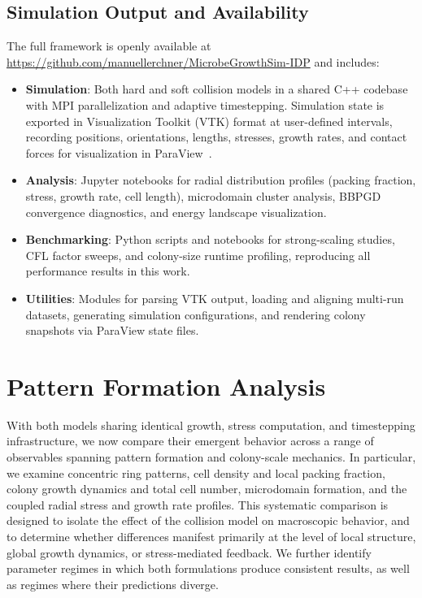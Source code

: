 \documentclass[a4paper,fleqn]{cas-dc}
\begin{document}
\subsection{Simulation Output and Availability}

The full framework is openly available at \url{https://github.com/manuellerchner/MicrobeGrowthSim-IDP} and includes:

\begin{itemize}
    \item \textbf{Simulation}: Both hard and soft collision models in a shared C++ codebase with MPI parallelization and adaptive timestepping. Simulation state is exported in Visualization Toolkit (VTK) format at user-defined intervals, recording positions, orientations, lengths, stresses, growth rates, and contact forces for visualization in ParaView~\cite{ahrens2005paraview}.

    \item \textbf{Analysis}: Jupyter notebooks for radial distribution profiles (packing fraction, stress, growth rate, cell length), microdomain cluster analysis, BBPGD convergence diagnostics, and energy landscape visualization.

    \item \textbf{Benchmarking}: Python scripts and notebooks for strong-scaling studies, CFL factor sweeps, and colony-size runtime profiling, reproducing all performance results in this work.

    \item \textbf{Utilities}: Modules for parsing VTK output, loading and aligning multi-run datasets, generating simulation configurations, and rendering colony snapshots via ParaView state files.
\end{itemize}

\section{Pattern Formation Analysis}

With both models sharing identical growth, stress computation, and timestepping infrastructure, we now compare their emergent behavior across a range of observables spanning pattern formation and colony-scale mechanics. In particular, we examine concentric ring patterns, cell density and local packing fraction, colony growth dynamics and total cell number, microdomain formation, and the coupled radial stress and growth rate profiles. This systematic comparison is designed to isolate the effect of the collision model on macroscopic behavior, and to determine whether differences manifest primarily at the level of local structure, global growth dynamics, or stress-mediated feedback. We further identify parameter regimes in which both formulations produce consistent results, as well as regimes where their predictions diverge.
\end{document}
